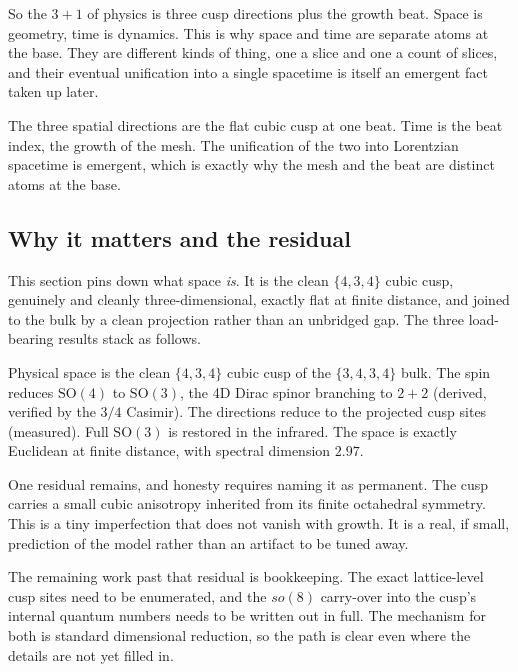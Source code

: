 So the $3+1$ of physics is three cusp directions plus the growth beat. Space is geometry, time is dynamics. This is why space and time are separate atoms at the base. They are different kinds of thing, one a slice and one a count of slices, and their eventual unification into a single spacetime is itself an emergent fact taken up later.

\begin{principle}
The three spatial directions are the flat cubic cusp at one beat. Time is the beat index, the growth of the mesh. The unification of the two into Lorentzian spacetime is emergent, which is exactly why the mesh and the beat are distinct atoms at the base.
\end{principle}

\subsection{Why it matters and the residual}

This section pins down what space \emph{is}. It is the clean $\{4,3,4\}$ cubic cusp, genuinely and cleanly three-dimensional, exactly flat at finite distance, and joined to the bulk by a clean projection rather than an unbridged gap. The three load-bearing results stack as follows.

\begin{result}
Physical space is the clean $\{4,3,4\}$ cubic cusp of the $\{3,4,3,4\}$ bulk. The spin reduces $\mathrm{SO}(4)$ to $\mathrm{SO}(3)$, the 4D Dirac spinor branching to $2+2$ (derived, verified by the $3/4$ Casimir). The directions reduce to the projected cusp sites (measured). Full $\mathrm{SO}(3)$ is restored in the infrared. The space is exactly Euclidean at finite distance, with spectral dimension $2.97$.
\end{result}

One residual remains, and honesty requires naming it as permanent. The cusp carries a small cubic anisotropy inherited from its finite octahedral symmetry. This is a tiny imperfection that does not vanish with growth. It is a real, if small, prediction of the model rather than an artifact to be tuned away.

The remaining work past that residual is bookkeeping. The exact lattice-level cusp sites need to be enumerated, and the $so(8)$ carry-over into the cusp's internal quantum numbers needs to be written out in full. The mechanism for both is standard dimensional reduction, so the path is clear even where the details are not yet filled in.
